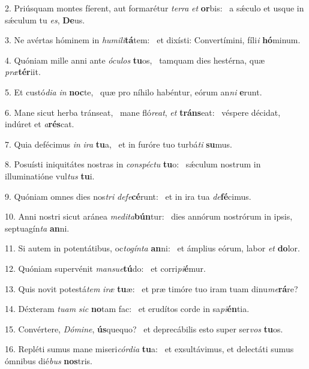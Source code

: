 2. Priúsquam montes fíerent, aut formarétur \textit{ter}\textit{ra} \textit{et} \textbf{or}bis: \ast\  a sǽculo et usque in sǽculum tu \textit{es}, \textbf{De}us.\

3. Ne avértas hóminem in \textit{hu}\textit{mi}\textit{li}\textbf{tá}tem: \ast\  et dixísti: Convertímini, fíli\textit{i} \textbf{hó}minum.\

4. Quóniam mille anni ante \textit{ó}\textit{cu}\textit{los} \textbf{tu}os, \ast\  tamquam dies hestérna, quæ \textit{præ}\textbf{tér}iit.\

5. Et custó\textit{di}\textit{a} \textit{in} \textbf{noc}te, \ast\  quæ pro níhilo habéntur, eórum an\textit{ni} \textbf{e}runt.\

6. Mane sicut herba tránseat, \dag\  mane fló\textit{re}\textit{at}, \textit{et} \textbf{tráns}eat: \ast\  véspere décidat, indúret et \textit{a}\textbf{rés}cat.\

7. Quia defécimus \textit{in} \textit{i}\textit{ra} \textbf{tu}a, \ast\  et in furóre tuo turbá\textit{ti} \textbf{su}mus.\

8. Posuísti iniquitátes nostras in \textit{con}\textit{spéc}\textit{tu} \textbf{tu}o: \ast\  sǽculum nostrum in illuminatióne vul\textit{tus} \textbf{tu}i.\

9. Quóniam omnes dies nos\textit{tri} \textit{de}\textit{fe}\textbf{cé}runt: \ast\  et in ira tua \textit{de}\textbf{fé}cimus.\

10. Anni nostri sicut aránea \textit{me}\textit{di}\textit{ta}\textbf{bún}tur: \ast\  dies annórum nostrórum in ipsis, septuagín\textit{ta} \textbf{an}ni.\

11. Si autem in potentátibus, oc\textit{to}\textit{gín}\textit{ta} \textbf{an}ni: \ast\  et ámplius eórum, labor \textit{et} \textbf{do}lor.\

12. Quóniam supervénit \textit{man}\textit{su}\textit{e}\textbf{tú}do: \ast\  et corri\textit{pi}\textbf{é}mur.\

13. Quis novit potestá\textit{tem} \textit{i}\textit{ræ} \textbf{tu}æ: \ast\  et præ timóre tuo iram tuam dinu\textit{me}\textbf{rá}re?\

14. Déxteram \textit{tu}\textit{am} \textit{sic} \textbf{no}tam fac: \ast\  et erudítos corde in sa\textit{pi}\textbf{én}tia.\

15. Convértere, \textit{Dó}\textit{mi}\textit{ne}, \textbf{ús}quequo? \ast\  et deprecábilis esto super ser\textit{vos} \textbf{tu}os.\

16. Repléti sumus mane miseri\textit{cór}\textit{di}\textit{a} \textbf{tu}a: \ast\  et exsultávimus, et delectáti sumus ómnibus dié\textit{bus} \textbf{nos}tris.\

